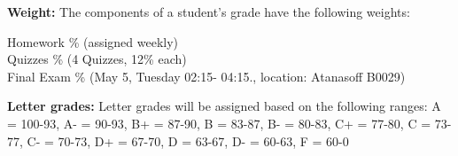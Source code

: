 \documentclass[12pt]{article}\usepackage[]{graphicx}\usepackage[]{color}
\begin{document}
\begin{center} 
	\begin{minipage}{6.5in}
		\begin{flushleft}
			\textbf{Weight:} The components of a student's grade have the following weights:\\
			\begin{center} 
				\begin{minipage}{6in}
					\begin{flushleft}
						Homework \%  (assigned weekly) \\
						Quizzes \%  (4 Quizzes, 12\% each) \\
						Final Exam \% (May 5, Tuesday 02:15- 04:15., location:  Atanasoff B0029) \\
					\end{flushleft}
				\end{minipage}
			\end{center}
		\end{flushleft}
	\end{minipage}
\end{center}

\begin{center} 
	\begin{minipage}{6.5in}
		\begin{flushleft}
			\textbf{Letter grades:} 
			Letter grades will be assigned based on the following ranges: A = 100-93, A- = 90-93, B+ = 87-90, B = 83-87, B- = 80-83, C+ = 77-80, C = 73-77, C- = 70-73, D+ = 67-70, D = 63-67, D- = 60-63, F = 60-0
		\end{flushleft}
	\end{minipage}
\end{center}
\end{document}
